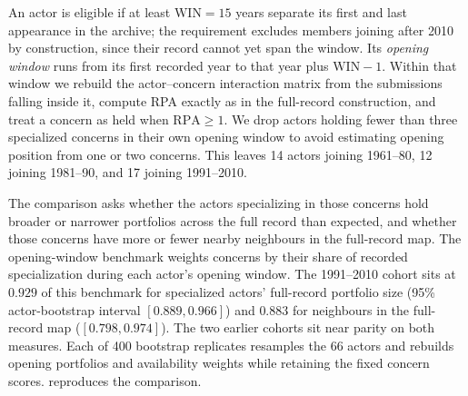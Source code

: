 \documentclass{fun_article}
\begin{document}
An actor is eligible if at least $\mathrm{WIN}=15$ years separate its first and last appearance in the archive; the requirement excludes members joining after 2010 by construction, since their record cannot yet span the window. Its \emph{opening window} runs from its first recorded year to that year plus $\mathrm{WIN}-1$. Within that window we rebuild the actor--concern interaction matrix from the submissions falling inside it, compute RPA exactly as in the full-record construction, and treat a concern as held when $\mathrm{RPA}\ge 1$. We drop actors holding fewer than three specialized concerns in their own opening window to avoid estimating opening position from one or two concerns. This leaves 14 actors joining 1961--80, 12 joining 1981--90, and 17 joining 1991--2010.

The comparison asks whether the actors specializing in those concerns hold broader or narrower portfolios across the full record than expected, and whether those concerns have more or fewer nearby neighbours in the full-record map. The opening-window benchmark weights concerns by their share of recorded specialization during each actor's opening window. The 1991--2010 cohort sits at $0.929$ of this benchmark for specialized actors' full-record portfolio size (95\% actor-bootstrap interval $[0.889,0.966]$) and $0.883$ for neighbours in the full-record map ($[0.798,0.974]$). The two earlier cohorts sit near parity on both measures. Each of 400 bootstrap replicates resamples the 66 actors and rebuilds opening portfolios and availability weights while retaining the fixed concern scores. \texttt{} reproduces the comparison.
\end{document}
